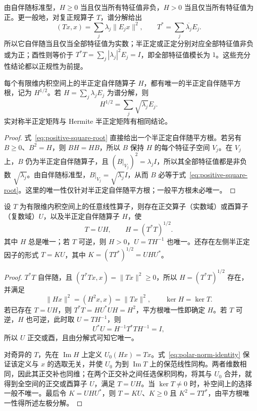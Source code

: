 由自伴随标准型，$H\geq0$ 当且仅当所有特征值非负，$H>0$ 当且仅当所有特征值为正。更一般地，对复正规算子 $T$，谱分解给出
\[
    (Tx,x)=\sum_j\lambda_j\|E_jx\|^2,\qquad
    T^*=\sum_j\overline{\lambda_j}E_j.
\]
所以它自伴随当且仅当全部特征值为实数；半正定或正定分别对应全部特征值非负或为正；酉性则等价于 $T^*T=\sum_j|\lambda_j|^2E_j=I$，即全部特征值模长为 $1$。这些充分性结论都以正规性为前提。

\begin{theorem}[半正定平方根]
\label{thm:positive-square-root}
每个有限维内积空间上的半正定自伴随算子 $H$，都有唯一的半正定自伴随平方根，记为 $H^{1/2}$。若 $H=\sum_j\lambda_jE_j$ 为谱分解，则
\begin{equation}
\label{eq:positive-square-root}
    H^{1/2}=\sum_j\sqrt{\lambda_j}E_j.
\end{equation}
实对称半正定矩阵与 Hermite 半正定矩阵有相同结论。
\end{theorem}
\begin{proof}
式~\eqref{eq:positive-square-root} 直接给出一个半正定自伴随平方根。若另有 $B\geq0$、$B^2=H$，则 $BH=HB$，所以 $B$ 保持 $H$ 的每个特征子空间 $V_j$。在 $V_j$ 上，$B$ 仍为半正定自伴随算子，且 $(B|_{V_j})^2=\lambda_jI$，所以其全部特征值都是非负数 $\sqrt{\lambda_j}$。由自伴随标准型，$B|_{V_j}=\sqrt{\lambda_j}I$，从而 $B$ 必等于式~\eqref{eq:positive-square-root}。这里的唯一性仅针对半正定自伴随平方根；一般平方根未必唯一。
\end{proof}

\begin{theorem}[极分解]
\label{thm:polar-decomposition}
设 $T$ 为有限维内积空间上的任意线性算子，则存在正交算子（实数域）或酉算子（复数域）$U$，以及半正定自伴随算子 $H$，使
\begin{equation}
\label{eq:polar-decomposition}
    T=UH,\qquad H=(T^*T)^{1/2}.
\end{equation}
其中 $H$ 总是唯一；若 $T$ 可逆，则 $H>0$，$U=TH^{-1}$ 也唯一。还存在左侧半正定因子的形式 $T=KU$，其中 $K=(TT^*)^{1/2}=UHU^*$。
\end{theorem}
\begin{proof}
$T^*T$ 自伴随，且 $(T^*Tx,x)=\|Tx\|^2\geq0$，所以 $H=(T^*T)^{1/2}$ 存在，并满足
\begin{equation}
\label{eq:polar-norm-identity}
    \|Hx\|^2=(H^2x,x)=\|Tx\|^2,
    \qquad \ker H=\ker T.
\end{equation}
若已存在 $T=UH$，则 $T^*T=HU^*UH=H^2$，平方根唯一性即确定 $H$。若 $T$ 可逆，$H$ 也可逆，此时取 $U=TH^{-1}$，则
\[
    U^*U=H^{-1}T^*TH^{-1}=I,
\]
所以 $U$ 正交或酉，且由分解式可知它唯一。

对奇异的 $T$，先在 $\operatorname{Im}H$ 上定义 $U_0(Hx)=Tx$。式~\eqref{eq:polar-norm-identity} 保证该定义与 $x$ 的选取无关，并使 $U_0$ 为到 $\operatorname{Im}T$ 上的保范线性同构。两者维数相同，因此其正交补也同维；在两个正交补之间任选保积同构，将其与 $U_0$ 合并，就得到全空间的正交或酉算子 $U$，满足 $T=UH$。当 $\ker T\ne0$ 时，补空间上的选择一般不唯一。最后令 $K=UHU^*$，则 $T=KU$、$K\geq0$ 且 $K^2=TT^*$，由平方根唯一性得所述左极分解。
\end{proof}

